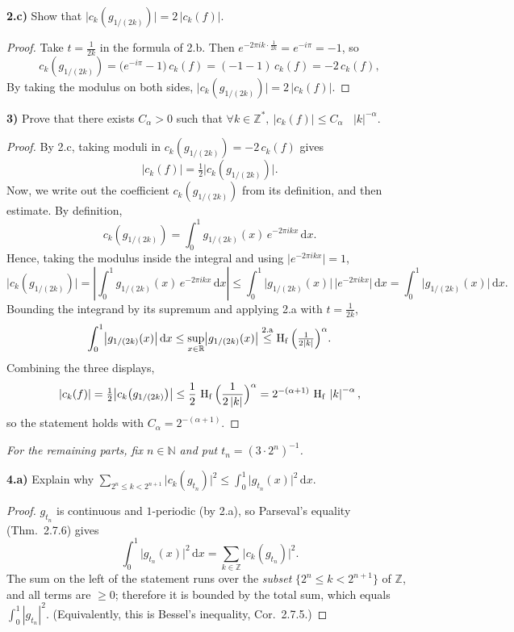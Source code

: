 \documentclass[11pt]{article}
\newcommand{\R}{\mathbb{R}}
\newcommand{\Z}{\mathbb{Z}}
\newcommand{\N}{\mathbb{N}}
\newcommand{\dd}{\,\mathrm{d}}
\newcommand{\abs}[1]{\left\lvert #1 \right\rvert}
\DeclareMathOperator{\Hf}{H_f}
\newcommand{\ck}[1]{c_{#1}}
\begin{document}
\bigskip
\noindent\textbf{2.c)} Show that $\bigl|\ck{k}\!\left(g_{1/(2k)}\right)\bigr|=2\,\abs{\ck{k}(f)}$.

\begin{proof}
Take $t=\tfrac1{2k}$ in the formula of 2.b. Then $e^{-2\pi i k\cdot \frac1{2k}}=e^{-i\pi}=-1$, so
\[
\ck{k}\!\left(g_{1/(2k)}\right)=\bigl(e^{-i\pi}-1\bigr)\,\ck{k}(f)=(-1-1)\,\ck{k}(f)=-2\,\ck{k}(f),
\]
By taking the modulus on both sides, $\bigl|\ck{k}\!\left(g_{1/(2k)}\right)\bigr|=2\,\abs{\ck{k}(f)}$.
\end{proof}

\bigskip
\noindent\textbf{3)} Prove that there exists $C_\alpha>0$ such that
$\displaystyle\forall k\in\Z^{*},\ \abs{\ck{k}(f)}\le C_\alpha\,\Hf\,\abs k^{-\alpha}$.

\begin{proof}
By 2.c, taking moduli in $\ck{k}\!\left(g_{1/(2k)}\right)=-2\,\ck{k}(f)$ gives
\[
\abs{\ck{k}(f)}=\tfrac12\bigl|\ck{k}\!\left(g_{1/(2k)}\right)\bigr| .
\]
Now, we write out the coefficient $\ck{k}\!\left(g_{1/(2k)}\right)$ from its definition, and then
estimate. By definition,
\[
\ck{k}\!\left(g_{1/(2k)}\right)=\int_0^1 g_{1/(2k)}(x)\,e^{-2\pi i k x}\dd x .
\]
Hence, taking the modulus inside the integral and using $\bigl|e^{-2\pi i k x}\bigr|=1$,
\[
\bigl|\ck{k}\!\left(g_{1/(2k)}\right)\bigr|
=\left|\int_0^1 g_{1/(2k)}(x)\,e^{-2\pi i k x}\dd x\right|
\le \int_0^1\bigl|g_{1/(2k)}(x)\bigr|\,\bigl|e^{-2\pi i k x}\bigr|\dd x
=\int_0^1\bigl|g_{1/(2k)}(x)\bigr|\dd x .
\]
Bounding the integrand by its supremum and applying 2.a with $t=\tfrac1{2k}$,
\[
\int_0^1\bigl|g_{1/(2k)}(x)\bigr|\dd x
\le \sup_{x\in\R}\bigl|g_{1/(2k)}(x)\bigr|
\overset{\text{2.a}}{\le} \Hf\,\Bigl(\tfrac1{2\abs k}\Bigr)^{\alpha}.
\]
Combining the three displays,
\[
\abs{\ck{k}(f)}=\tfrac12\bigl|\ck{k}\!\left(g_{1/(2k)}\right)\bigr|
\le\frac12\,\Hf\,\Bigl(\frac1{2\abs k}\Bigr)^{\alpha}
=2^{-(\alpha+1)}\,\Hf\,\abs k^{-\alpha},
\]
so the statement holds with $C_\alpha=2^{-(\alpha+1)}$.
\end{proof}

\medskip
\noindent\emph{For the remaining parts, fix $n\in\N$ and put $t_n=(3\cdot 2^{n})^{-1}$.}

\bigskip
\noindent\textbf{4.a)} Explain why
$\displaystyle\sum_{2^{n}\le k<2^{n+1}}\bigl|\ck{k}(g_{t_n})\bigr|^{2}\le\int_0^1\bigl|g_{t_n}(x)\bigr|^{2}\dd x$.

\begin{proof}
$g_{t_n}$ is continuous and $1$-periodic (by 2.a), so Parseval's equality (Thm.~2.7.6) gives
\[
\int_0^1\bigl|g_{t_n}(x)\bigr|^2\dd x=\sum_{k\in\Z}\bigl|\ck{k}(g_{t_n})\bigr|^{2}.
\]
The sum on the left of the statement runs over the \emph{subset} $\{2^{n}\le k<2^{n+1}\}$ of $\Z$,
and all terms are $\ge0$; therefore it is bounded by the total sum, which equals
$\int_0^1\abs{g_{t_n}}^2$. (Equivalently, this is Bessel's inequality, Cor.~2.7.5.)
\end{proof}
\end{document}
